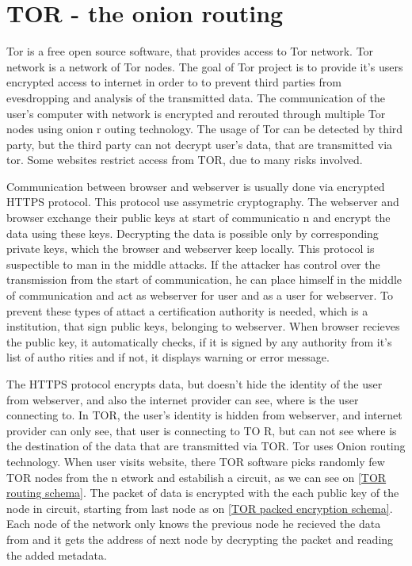 \documentclass[
  digital, %
  table,   %
  lof,     %
  lot,     %
  oneside
]{fithesis3}
\begin{document}
\section{TOR - the onion routing}

Tor is a free open source software, that provides access to Tor network. Tor network is a network of Tor nodes.
The goal of Tor project is to provide it's users encrypted access to internet in order to to prevent third parties
from evesdropping and analysis of the transmitted data.
The communication of the user's computer with network is encrypted and rerouted through multiple Tor nodes using onion r
outing technology.
The usage of Tor can be detected by third party, but the third party can not decrypt user's data, that are transmitted
 via tor.
Some websites restrict access from TOR, due to many risks involved.

Communication between browser and webserver is usually done via encrypted HTTPS protocol.
This protocol use assymetric cryptography. The webserver and browser exchange their public keys at start of communicatio
n
and encrypt the data using these keys. Decrypting the data is possible only by corresponding private keys,
which the browser and webserver keep locally. This protocol is suspectible to man in the middle attacks.
If the attacker has control over the transmission from the start of communication, he can place himself in the middle
 of communication and act as webserver for user and as a user for webserver. To prevent these types of attact
 a certification authority is needed, which is a institution, that sign public keys, belonging to webserver.
 When browser recieves the public key, it automatically checks, if it is signed by any authority from it's list of autho
rities
 and if not, it displays warning or error message.
 
The HTTPS protocol encrypts data, but doesn't hide the identity of the user from webserver,
 and also the internet provider can see, where is the user connecting to.
 In TOR, the user's identity is hidden from webserver, and internet provider can only see, that user is connecting to TO
R,
 but can not see where is the destination of the data that are transmitted via TOR.
 Tor uses Onion routing technology. When user visits website, there TOR software picks randomly few TOR nodes from the n
etwork
 and estabilish a circuit, as we can see on \ref{TOR routing schema}. 
 The packet of data is encrypted with the each public key of the node in circuit, starting from last node as on \ref{TOR
 packed encryption schema}.
 Each node of the network only knows the previous node he recieved the data from and it gets the address 
 of next node by decrypting the packet and reading the added metadata.
 
\end{document}
